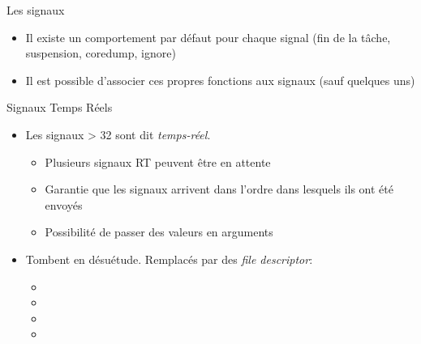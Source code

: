 \begin{frame}[fragile=singleslide]{Les signaux}
\begin{itemize}
\begin{columns}
      \begin{column}{3cm}
        \begin{itemize} 
        \item 25: XFSZ
        \item 26: VTALRM
        \item 27: PROF
        \item 28: WINCH
        \item 29: POLL
        \item 30: PWR
        \item 31: SYS
        \end{itemize}
      \end{column}
    \end{columns}
    \vspace{2ex}
  \item Il existe  un comportement par défaut pour  chaque signal (fin
    de la tâche, suspension, coredump, ignore)
  \item Il  est possible d'associer ces propres  fonctions aux signaux
    (sauf quelques uns)
  \end{itemize}
\end{frame}

\begin{frame}[fragile=singleslide]{Signaux Temps Réels}
\begin{itemize} 
\item Les signaux > 32 sont dit \emph{temps-réel}.
    \begin{itemize}
    \item Plusieurs signaux RT peuvent être en attente
    \item Garantie que les signaux arrivent dans l'ordre dans lesquels
      ils ont été envoyés
    \item Possibilité de passer des valeurs en arguments
    \end{itemize} 
  \item Tombent en désuétude. Remplacés par des \emph{file descriptor}:
    \begin{itemize} 
    \item {}
    \item {}
    \item {}
    \item {}
    \end{itemize}  
  \end{itemize} 
\end{frame}

